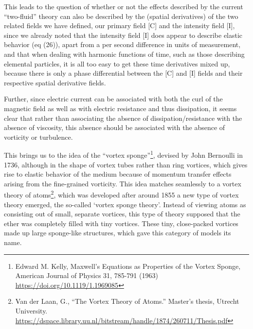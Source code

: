 \documentclass[a4paper]{article}
\newcommand\textstyleNone[1]{#1}
\begin{document}
{\color[rgb]{0.101960786,0.101960786,0.101960786}
\textstyleNone{This leads to the question of whether or not the effects described by the current ``two-fluid'' theory
can also be described by the (spatial derivatives) of the two related fields we have de}\textstyleNone{fined, our
primary field [C] and the intensity field [I], since we already noted that the intensity field [I] does appear to
describe elastic behavior (eq (26)), apart from a per second difference in units of measurement, and that when dealing
with harmonic functions of time, such as those describing elemental particles, it is all too easy to get these time
derivatives mixed up, because there is only a phase differential between the [C] and [I] fields and their respective
spatial derivative fields. }}

{\color[rgb]{0.101960786,0.101960786,0.101960786}
\textstyleNone{Further, since electric current can be associated with both the curl of the magnetic field as well as
with electric resistance and thus dissipation, it seems clear that rather than associating the absence of
dissipation/resistance with the absence of viscosity, this absence should be associated with the absence of vorticity
or turbulence. }}

{\color[rgb]{0.101960786,0.101960786,0.101960786}
\textstyleNone{This brings us to the idea of the ``vortex sponge''}\footnote{ Edward M. Kelly, {\textquotedbl}Maxwell's
Equations as Properties of the Vortex Sponge{\textquotedbl}, American Journal of Physics 31, 785-791 (1963)
\url{https://doi.org/10.1119/1.1969085}  \par }\textstyleNone{,  devised by John Bernoulli in 1736, although in the
shape of vortex tubes rather than ring vortices, which gives rise to elastic behavior of the medium because of momentum
transfer effects arising from the fine-grained vorticity. This idea matches seamlessly to a vortex theory of
atoms}\footnote{ \textcolor{black}{V}an der Laan, G., ``The Vortex Theory of Atoms.'' Master's thesis, Utrecht
University. \url{https://dspace.library.uu.nl/bitstream/handle/1874/260711/Thesis.pdf} \par  }\textstyleNone{, which
was developed after around 1855 a new type of vortex theory emerged, the so-called `vortex sponge theory'. Instead of
viewing atoms as consisting out of small, separate vortices, this type of theory supposed that the ether was completely
filled with tiny vortices. These tiny, close-packed vortices made up large sponge-like structures, which gave this
category of models its name. }}
\end{document}

